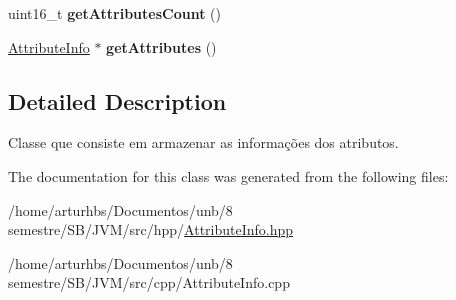 \begin{DoxyCompactItemize}
\item 
uint16\+\_\+t {\bfseries get\+Attributes\+Count} ()\hypertarget{classCodeAttribute_a795890e641c508602f2b842af5779fc6}{}\label{classCodeAttribute_a795890e641c508602f2b842af5779fc6}

\item 
\hyperlink{classAttributeInfo}{Attribute\+Info} $\ast$ {\bfseries get\+Attributes} ()\hypertarget{classCodeAttribute_a5f36ae9a19d451dbb7c1aedad06454ff}{}\label{classCodeAttribute_a5f36ae9a19d451dbb7c1aedad06454ff}

\end{DoxyCompactItemize}


\subsection{Detailed Description}
Classe que consiste em armazenar as informações dos atributos. 

The documentation for this class was generated from the following files\+:\begin{DoxyCompactItemize}
\item 
/home/arturhbs/\+Documentos/unb/8 semestre/\+S\+B/\+J\+V\+M/src/hpp/\hyperlink{AttributeInfo_8hpp}{Attribute\+Info.\+hpp}\item 
/home/arturhbs/\+Documentos/unb/8 semestre/\+S\+B/\+J\+V\+M/src/cpp/Attribute\+Info.\+cpp\end{DoxyCompactItemize}
